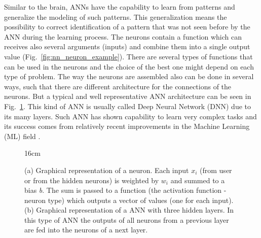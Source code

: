Similar to the brain, ANNs have the capability to learn from patterns and generalize the modeling of such patterns. This generalization means the possibility to correct identification of a pattern that was not seen before by the ANN during the learning process. The neurons contain a function which can receives also several arguments (inputs) and combine them into a single output value (Fig.~\ref{fig:nn_neuron_example}). There are several types of functions that can be used in the neurons and the choice of the best one might depend on each type of problem. The way the neurons are assembled also can be done in several ways, such that there are different architecture for the connections of the neurons. But a typical and well representative ANN architecture can be seen in Fig.~\ref{fig:neuron_and_dnn}. This kind of ANN is usually called Deep Neural Network (DNN) due to its many layers. Such ANN has shown capability to learn very complex tasks and its success comes from relatively recent improvements in the Machine Learning (ML) field \cite{bib:GlorotAndBendio2010,bib:NairAndHinton2010,bib:Zeiler_et_al2013}.

\begin{figure}[hbtp]{16cm}
	\caption{(a) Graphical representation of a neuron. Each input \textit{$x_i$} (from user or from the hidden neurons) is weighted by \textit{$w_i$} and summed to a bias \textit{b}. The sum is passed to a function (the activation function - neuron type) which outputs a vector of values (one for each input). (b) Graphical representation of a ANN with three hidden layers. In this type of ANN the outputs of all neurons from a previous layer are fed into the neurons of a next layer.}
	\centering
	\quad
	\quad
	\quad
	\label{fig:neuron_and_dnn}
\end{figure}

